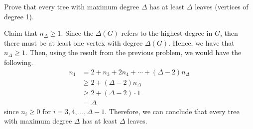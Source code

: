 \question
  Prove that every tree with maximum degree $\Delta$ has at least $\Delta$ 
  leaves (vertices of degree 1).

  \begin{solution}
    Claim that \(n_\Delta \geq 1\). Since the \(\Delta(G)\) refers to the
    highest degree in \(G\), then there must be at least one vertex with degree
    \(\Delta(G)\). Hence, we have that \(n_\Delta \geq 1\). Then, using the
    result from the previous problem, we would have the following.
    \[ 
      \begin{aligned}
        n_1 &= 2 + n_3 + 2n_4 + \cdots + (\Delta-2)n_\Delta \\ 
            &\geq 2 + (\Delta-2)n_\Delta \\ 
            &\geq 2 + (\Delta - 2) \cdot 1 \\ 
            &= \Delta
      \end{aligned}
    \]
    since \(n_i \geq 0\) for \(i = 3, 4, \ldots, \Delta-1\). Therefore, we can
    conclude that every tree with maximum degree \(\Delta\) has at least
    \(\Delta\) leaves.
  \end{solution}
